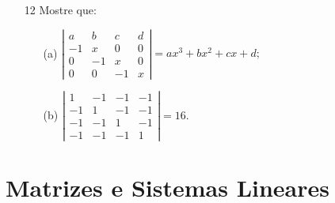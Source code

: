 \documentclass[11pt]{article}
\begin{document}
\begin{itemize}
\item[12] Mostre que:
\begin{itemize}
\item[(a)] $
\left|\begin{array}{rrrr}
a&b&c&d\\
-1&x&0&0\\
0&-1&x&0\\
0&0&-1&x
\end{array}\right|=ax^3+bx^2+cx+d;
$
\item[(b)] $
\left|\begin{array}{rrrr}
1&-1&-1&-1\\
-1&1&-1&-1\\
-1&-1&1&-1\\
-1&-1&-1&1
\end{array}\right|=16.
$
\end{itemize}
\end{itemize}

\section*{Matrizes e Sistemas Lineares}
\end{document}
